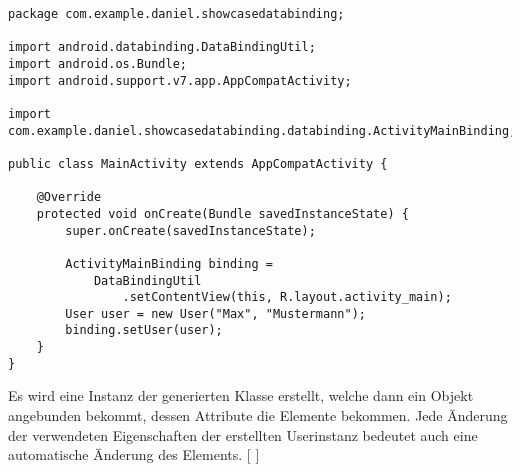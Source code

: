 \documentclass[FIPLY_base.tex]{subfiles}
\begin{document}
\begin{lstlisting}[caption={Die Aktivitätenklasse nach der Integration einer Datenanbindung.},label=DescriptiveLabel]
package com.example.daniel.showcasedatabinding;

import android.databinding.DataBindingUtil;
import android.os.Bundle;
import android.support.v7.app.AppCompatActivity;

import com.example.daniel.showcasedatabinding.databinding.ActivityMainBinding;

public class MainActivity extends AppCompatActivity {

	@Override
	protected void onCreate(Bundle savedInstanceState) {
		super.onCreate(savedInstanceState);

		ActivityMainBinding binding =
			DataBindingUtil
				.setContentView(this, R.layout.activity_main);
		User user = new User("Max", "Mustermann");
		binding.setUser(user);
	}
}
\end{lstlisting}

Es wird eine Instanz der generierten Klasse erstellt, welche dann ein Objekt angebunden bekommt, dessen Attribute die Elemente bekommen. Jede Änderung der verwendeten Eigenschaften der erstellten Userinstanz bedeutet auch eine automatische Änderung des Elements. 
[ \cite{datbshowcase}]
\end{document}
